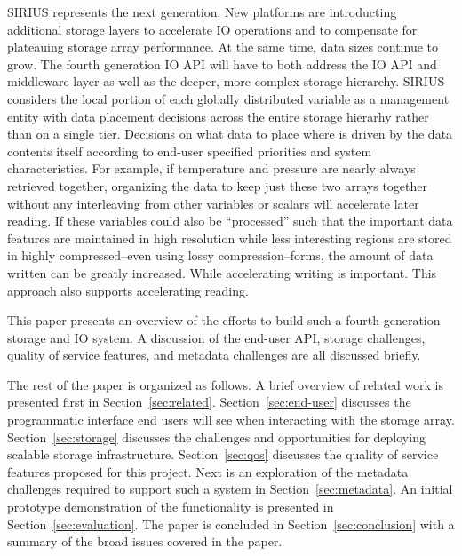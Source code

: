 \documentclass[letterpaper,twocolumn,10pt]{article}
\begin{document}
SIRIUS represents the next generation. New platforms are introducting
additional storage layers to accelerate IO operations and to compensate for
plateauing storage array performance. At the same time, data sizes continue
to grow. The fourth generation IO API will have to both address the IO API
and middleware layer as well as the deeper, more complex storage hierarchy.
SIRIUS considers the local portion of each globally distributed variable as a
management entity with data placement decisions across the entire storage
hierarhy rather than on a single tier.  Decisions on what data to place where
is driven by the data contents itself according to end-user specified
priorities and system characteristics. For example, if temperature and pressure
are nearly always retrieved together, organizing the data to keep just these
two arrays together without any interleaving from other variables or scalars
will accelerate later reading. If these variables could also be ``processed''
such that the important data features are maintained in high resolution while
less interesting regions are stored in highly compressed--even using lossy
compression--forms, the amount of data written can be greatly increased. While
accelerating writing is important. This approach also supports accelerating
reading.

This paper presents an overview of the efforts to build such a fourth
generation storage and IO system. A discussion of the end-user API, storage
challenges, quality of service features, and metadata challenges are all
discussed briefly.


The rest of the paper is organized as follows. A brief overview of related work
is presented first in Section~\ref{sec:related}. Section~\ref{sec:end-user}
discusses the programmatic interface end users will see when interacting with
the storage array.
Section~\ref{sec:storage}
discusses the challenges and opportunities for deploying scalable storage
infrastructure.
Section~\ref{sec:qos}
discusses the quality of service features proposed for this project.
Next is an exploration of the metadata challenges required to support such a
system in Section~\ref{sec:metadata}.
An initial prototype demonstration of the functionality is presented in
Section~\ref{sec:evaluation}.
The paper is concluded in
Section~\ref{sec:conclusion} with a summary of the broad issues covered in the
paper.
\end{document}
